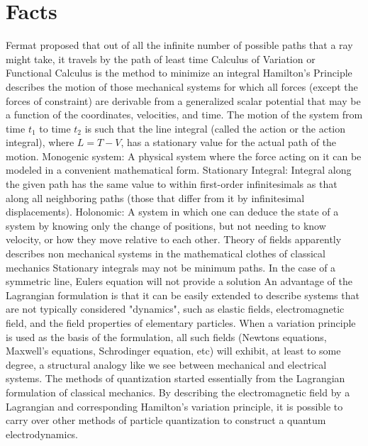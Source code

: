 \documentclass[12pt]{article}
\begin{document}
    
    
    

    
\section{Facts}
    Fermat proposed that out of all the infinite number of possible paths that a ray might take, it travels by the path of least time
    \newline Calculus of Variation or Functional Calculus is the method to minimize an integral
    \newline Hamilton's Principle describes the motion of those mechanical systems for which all forces (except the forces of constraint) are derivable from a generalized scalar potential that may be a function of the coordinates, velocities, and time. The motion of the system from time $t_1$ to time $t_2$ is such that the line integral (called the action or the action integral), where $L = T - V$, has a stationary value for the actual path of the motion.
    \newline Monogenic system: A physical system where the force acting on it can be modeled in a convenient mathematical form.
    \newline Stationary Integral: Integral along the given path has the same value to within first-order infinitesimals as that along all neighboring paths (those that differ from it by infinitesimal displacements).
    \newline Holonomic: A system in which one can deduce the state of a system by knowing only the change of positions, but not needing to know velocity, or how they move relative to each other. 
    \newline Theory of fields apparently describes non mechanical systems in the mathematical clothes of classical mechanics
    \newline Stationary integrals may not be minimum paths. In the case of a symmetric line, Eulers equation will not provide a solution
    \newline An advantage of the Lagrangian formulation is that it can be easily extended to describe systems that are not typically considered "dynamics", such as elastic fields, electromagnetic field, and the field properties of elementary particles. 
    \newline When a variation principle is used as the basis of the formulation, all such fields (Newtons equations, Maxwell's equations, Schrodinger equation, etc) will exhibit, at least to some degree, a structural analogy like we see between mechanical and electrical systems.  
    \newline The methods of quantization started essentially from the Lagrangian formulation of classical mechanics. By describing the electromagnetic field by a Lagrangian and corresponding Hamilton's variation principle, it is possible to carry over other methods of particle quantization to construct a quantum electrodynamics. 
\end{document}
